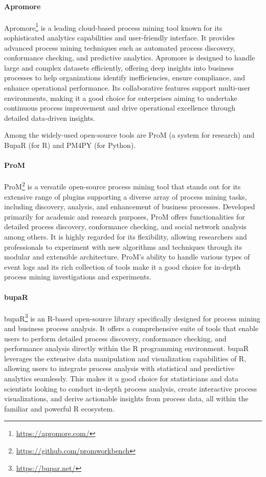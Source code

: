 \paragraph*{Apromore}
Apromore\footnote{\url{https://apromore.com/}} is a leading cloud-based process mining tool known for its sophisticated analytics capabilities and user-friendly interface. It provides advanced process mining techniques such as automated process discovery, conformance checking, and predictive analytics. Apromore is designed to handle large and complex datasets efficiently, offering deep insights into business processes to help organizations identify inefficiencies, ensure compliance, and enhance operational performance. Its collaborative features support multi-user environments, making it a good choice for enterprises aiming to undertake continuous process improvement and drive operational excellence through detailed data-driven insights.

Among the widely-used open-source tools are ProM (a system for research) and BupaR (for R) and PM4PY (for Python).

\paragraph*{ProM}
ProM\footnote{\url{https://github.com/promworkbench}} is a versatile open-source process mining tool that stands out for its extensive range of plugins supporting a diverse array of process mining tasks, including discovery, analysis, and enhancement of business processes. Developed primarily for academic and research purposes, ProM offers functionalities for detailed process discovery, conformance checking, and social network analysis among others. It is highly regarded for its flexibility, allowing researchers and professionals to experiment with new algorithms and techniques through its modular and extensible architecture. ProM's ability to handle various types of event logs and its rich collection of tools make it a good choice for in-depth process mining investigations and experiments.

\paragraph*{bupaR}
bupaR\footnote{\url{https://bupar.net/}} is an R-based open-source library specifically designed for process mining and business process analysis. It offers a comprehensive suite of tools that enable users to perform detailed process discovery, conformance checking, and performance analysis directly within the R programming environment. bupaR leverages the extensive data manipulation and visualization capabilities of R, allowing users to integrate process analysis with statistical and predictive analytics seamlessly. This makes it a good choice for statisticians and data scientists looking to conduct in-depth process analysis, create interactive process visualizations, and derive actionable insights from process data, all within the familiar and powerful R ecosystem.

